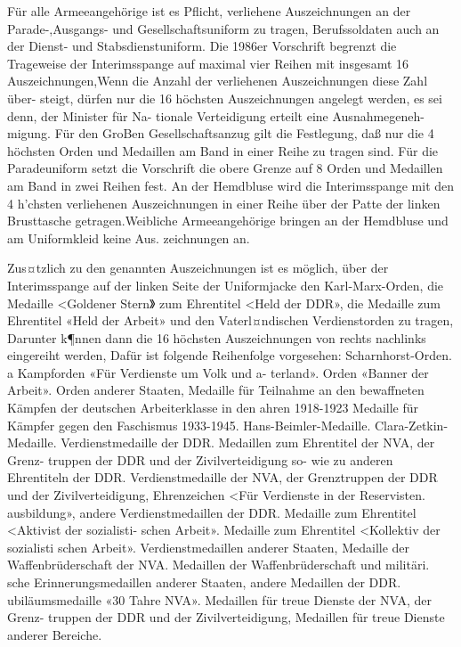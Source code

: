 

Für alle Armeeangehörige ist es Pflicht, verliehene
Auszeichnungen an der Parade-,Ausgangs- und
Gesellschaftsuniform zu tragen, Berufssoldaten
auch an der Dienst- und Stabsdienstuniform.
Die 1986er Vorschrift begrenzt die Trageweise
der Interimsspange auf maximal vier Reihen mit
insgesamt 16 Auszeichnungen,Wenn die Anzahl
der verliehenen Auszeichnungen diese Zahl über-
steigt, dürfen nur die 16 höchsten Auszeichnungen
angelegt werden, es sei denn, der Minister für Na-
tionale Verteidigung erteilt eine Ausnahmegeneh-
migung. Für den GroBen Gesellschaftsanzug gilt
die Festlegung, daß nur die 4 höchsten Orden und
Medaillen am Band in einer Reihe zu tragen sind.
Für die Paradeuniform setzt die Vorschrift die
obere Grenze auf 8 Orden und Medaillen am Band
in zwei Reihen fest.
An der Hemdbluse wird die Interimsspange mit
den 4 h'chsten verliehenen Auszeichnungen in
einer Reihe über der Patte der linken Brusttasche
getragen.Weibliche Armeeangehörige bringen an
der Hemdbluse und am Uniformkleid keine Aus.
zeichnungen an.

Zus¤tzlich zu den genannten Auszeichnungen ist
es möglich, über der Interimsspange auf der linken
Seite der Uniformjacke den Karl-Marx-Orden, die
Medaille <Goldener Stern》 zum Ehrentitel <Held
der DDR», die Medaille zum Ehrentitel «Held der
Arbeit» und den Vaterl¤ndischen Verdienstorden
zu tragen, Darunter k¶nnen dann die 16 höchsten
Auszeichnungen von rechts nachlinks eingereiht
werden, Dafür ist folgende Reihenfolge vorgesehen:
Scharnhorst-Orden.
a
Kampforden «Für Verdienste um Volk und a-
terland».
Orden «Banner der Arbeit».
Orden anderer Staaten,
Medaille für Teilnahme an den bewaffneten
Kämpfen der deutschen Arbeiterklasse in den
ahren 1918-1923
Medaille für Kämpfer gegen den Faschismus
1933-1945.
Hans-Beimler-Medaille.
Clara-Zetkin-Medaille.
Verdienstmedaille der DDR.
Medaillen zum Ehrentitel der NVA, der Grenz-
truppen der DDR und der Zivilverteidigung so-
wie zu anderen Ehrentiteln der DDR.
Verdienstmedaille der NVA, der Grenztruppen
der DDR und der Zivilverteidigung,
Ehrenzeichen <Für Verdienste in der Reservisten.
ausbildung»,
andere Verdienstmedaillen der DDR.
Medaille zum Ehrentitel <Aktivist der sozialisti-
schen Arbeit».
Medaille zum Ehrentitel <Kollektiv der sozialisti
schen Arbeit».
Verdienstmedaillen anderer Staaten,
Medaille der Waffenbrüderschaft der NVA.
Medaillen der Waffenbrüderschaft und militäri.
sche Erinnerungsmedaillen anderer Staaten,
andere Medaillen der DDR.
ubiläumsmedaille «30 Tahre NVA».
Medaillen für treue Dienste der NVA, der Grenz-
truppen der DDR und der Zivilverteidigung,
Medaillen für treue Dienste anderer Bereiche.


